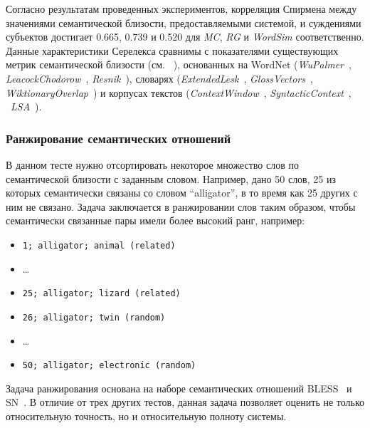 \documentclass[a4paper,10pt,twoside]{article}
\begin{document}
 Согласно результатам проведенных экспериментов, корреляция Спирмена между значениями семантической близости, предоставляемыми системой, и суждениями субъектов достигает 
0.665, 0.739 и 0.520 для \textit{MC}, \textit{RG} и \textit{WordSim} соответственно. Данные характеристики Серелекса сравнимы с показателями существующих метрик семантической близости (см. ~\cite{panchenko2012konvens}), основанных на WordNet (\textit{WuPalmer}~\cite{wu1994verbs}, \textit{LeacockChodorow}~\cite{leacock1998}, \textit{Resnik}~\cite{resnik1995}), словарях (\textit{ExtendedLesk}~\cite{banerjee2003extended}, \textit{GlossVectors}~\cite{patwardhan2006using}, \textit{WiktionaryOverlap}~\cite{zesch2008extracting}) и  корпусах текстов (\textit{ContextWindow}~\cite{cruys2010mining}, \textit{SyntacticContext}~\cite{cruys2010mining}, ~\textit{LSA}~\cite{landauer1998introduction}).




\subsubsection{Ранжирование семантических отношений}

В данном тесте нужно отсортировать некоторое множество слов по семантической близости с заданным словом. Например, дано 50 слов, 25 из которых семантически связаны со словом ``alligator'', в то время как 25 других с ним не связано. Задача заключается в ранжировании слов таким образом, чтобы семантически связанные пары имели более высокий ранг, например:

\begin{itemize}
\footnotesize
\item \texttt{1; alligator; animal (related)}
\item \ldots
\item \texttt{25; alligator; lizard (related)}
\item \texttt{26; alligator; twin (random)}
\item \ldots
\item \texttt{50; alligator; electronic (random) }
\end{itemize}

Задача ранжирования основана на наборе семантических отношений BLESS~\cite{baroniwe} и SN~\cite{panchenko2012study}. В отличие от трех других тестов, данная задача позволяет оценить не только относительную точность, но и относительную полноту системы.
\end{document}
